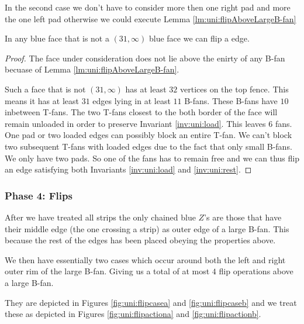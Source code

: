 In the second case we don't have to consider more then one right pad and more the one left pad otherwise we could execute Lemma \ref{lm:uni:flipAboveLargeB-fan}

\begin{lemma}
  \label{lm:}
  In any blue face that is not a $(31, \infty)$ blue face  we can flip a edge.
\end{lemma}
\begin{proof}
  The face under consideration does not lie above the enirty of any B-fan becuase of Lemma \ref{lm:uni:flipAboveLargeB-fan}.

  Such a face that is not $(31, \infty)$ has at least $32$ vertices on the top fence. This means it has at least $31$ edges lying in at least $11$ B-fans. These B-fans have $10$ inbetween T-fans. The two T-fans  closest to the both border of the face will remain unloaded in order to preserve Invariant \ref{inv:uni:load}. This leaves $6$ fans. One pad or two loaded edges can possibly block an entire T-fan. We can't block two subsequent T-fans with loaded edges due to the fact that only small B-fans. We only have two pads. So one of the fans has to remain free and we can thus flip an edge satisfying both Invariants \ref{inv:uni:load} and \ref{inv:uni:rest}.
\end{proof}


\subsubsection{Phase 4: Flips}
After we have treated all strips the only chained blue $Z$'s are those that have their middle edge (the one crossing a strip) as outer edge of a large B-fan. This because the rest of the edges has been placed obeying the properties above.

We then have essentially two cases which occur around  both the left and right outer rim of the large B-fan. Giving us a total of at most $4$ flip operations above a large B-fan.

They are depicted in Figures \ref{fig:uni:flipcasea} and \ref{fig:uni:flipcaseb}  and we treat these as depicted in Figures \ref{fig:uni:flipactiona} and \ref{fig:uni:flipactionb}.


